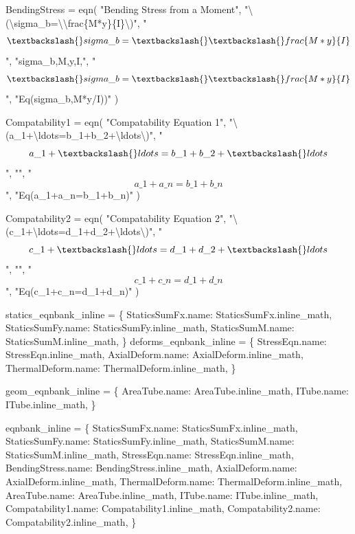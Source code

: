 \documentclass[
  letterpaper,
  DIV=11,
  numbers=noendperiod]{scrreprt}
\newenvironment{Shaded}{\begin{snugshade}}{\end{snugshade}}
\newcommand{\NormalTok}[1]{\textcolor[rgb]{0.00,0.23,0.31}{#1}}
\begin{document}
\begin{Shaded}
\begin{Highlighting}[]
\NormalTok{BendingStress = eqn(}
\NormalTok{    "Bending Stress from a Moment",}
\NormalTok{    "\textbackslash{}(\textbackslash{}sigma\_b=\textbackslash{}\textbackslash{}frac\{M*y\}\{I\}\textbackslash{})",}
\NormalTok{    "$$\textbackslash{}sigma\_b=\textbackslash{}\textbackslash{}frac\{M*y\}\{I\}$$",}
\NormalTok{    "sigma\_b,M,y,I,",}
\NormalTok{    "$$\textbackslash{}sigma\_b=\textbackslash{}\textbackslash{}frac\{M*y\}\{I\}$$", }
\NormalTok{    "Eq(sigma\_b,M*y/I))" }
\NormalTok{)}

\NormalTok{Compatability1 = eqn(}
\NormalTok{    "Compatability Equation 1",}
\NormalTok{    "\textbackslash{}(a\_1+\textbackslash{}ldots=b\_1+b\_2+\textbackslash{}ldots\textbackslash{})", }
\NormalTok{    "$$a\_1+\textbackslash{}ldots=b\_1+b\_2+\textbackslash{}ldots$$", }
\NormalTok{    "",}
\NormalTok{    "$$a\_1+a\_n=b\_1+b\_n$$",}
\NormalTok{    "Eq(a\_1+a\_n=b\_1+b\_n)" }
\NormalTok{)}

\NormalTok{Compatability2 = eqn(}
\NormalTok{    "Compatability Equation 2",}
\NormalTok{    "\textbackslash{}(c\_1+\textbackslash{}ldots=d\_1+d\_2+\textbackslash{}ldots\textbackslash{})", }
\NormalTok{    "$$c\_1+\textbackslash{}ldots=d\_1+d\_2+\textbackslash{}ldots$$", }
\NormalTok{    "",}
\NormalTok{    "$$c\_1+c\_n=d\_1+d\_n$$",}
\NormalTok{    "Eq(c\_1+c\_n=d\_1+d\_n)" }
\NormalTok{)}


\NormalTok{statics\_eqnbank\_inline = \{}
\NormalTok{    StaticsSumFx.name: StaticsSumFx.inline\_math,}
\NormalTok{    StaticsSumFy.name: StaticsSumFy.inline\_math,}
\NormalTok{    StaticsSumM.name: StaticsSumM.inline\_math,}
\NormalTok{\}}
\NormalTok{deforms\_eqnbank\_inline = \{}
\NormalTok{    StressEqn.name: StressEqn.inline\_math,}
\NormalTok{    AxialDeform.name: AxialDeform.inline\_math,}
\NormalTok{    ThermalDeform.name: ThermalDeform.inline\_math,}
\NormalTok{\}}

\NormalTok{geom\_eqnbank\_inline = \{}
\NormalTok{    AreaTube.name: AreaTube.inline\_math,}
\NormalTok{    ITube.name: ITube.inline\_math,}
\NormalTok{\}}

\NormalTok{eqnbank\_inline = \{}
\NormalTok{    StaticsSumFx.name: StaticsSumFx.inline\_math,}
\NormalTok{    StaticsSumFy.name: StaticsSumFy.inline\_math,}
\NormalTok{    StaticsSumM.name: StaticsSumM.inline\_math,}
\NormalTok{    StressEqn.name: StressEqn.inline\_math,}
\NormalTok{    BendingStress.name: BendingStress.inline\_math,}
\NormalTok{    AxialDeform.name: AxialDeform.inline\_math,}
\NormalTok{    ThermalDeform.name: ThermalDeform.inline\_math,}
\NormalTok{    AreaTube.name: AreaTube.inline\_math,}
\NormalTok{    ITube.name: ITube.inline\_math,}
\NormalTok{    Compatability1.name: Compatability1.inline\_math,}
\NormalTok{    Compatability2.name: Compatability2.inline\_math,}
\NormalTok{\}}


\end{Highlighting}
\end{Shaded}
\end{document}

